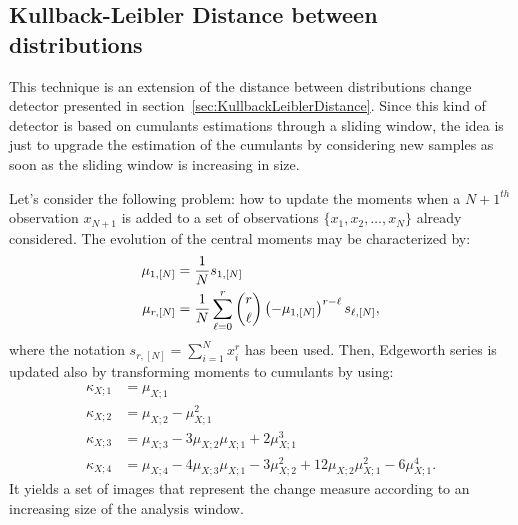 \subsection{Kullback-Leibler Distance between distributions}
\label{sec:KullbackLeiblerProfile}

This technique is an extension of the distance between distributions 
change detector presented in section~\ref{sec:KullbackLeiblerDistance}.
Since this kind of detector is based on cumulants estimations through
a sliding window, the idea is just to upgrade the estimation of the cumulants
by considering new samples as soon as the sliding window is increasing in size.

Let's consider the following problem: how to update the moments when a
$N+1^{th}$ observation $x_{N+1}$ is added to a set of observations $\{x_1, x_2, \ldots,
x_N\}$ already considered.
The evolution of the central moments may be characterized by:
\begin{align}\label{eqMomentN}
	\mu_{1,[N]} & = \frac{1}{N} s_{1,[N]} \\
	\mu_{r,[N]} & = \frac{1}{N} \sum_{\ell = 0}^r \binom{r}{\ell} 
									\left( -\mu_{1,[N]} \right)^{r-\ell}
									s_{\ell,[N]}, \notag
\end{align}
where the
notation $s_{r,[N]} = \sum_{i=1}^N x_i^r$ has been used.
Then, Edgeworth series is updated also by transforming moments to
cumulants by using:
\begin{equation}\label{eqCumsMoms}
  \begin{split}
\kappa_{X;1} &= \mu_{X;1}\\
\kappa_{X;2} &= \mu_{X;2}-\mu_{X;1}^2\\
\kappa_{X;3} &= \mu_{X;3} - 3\mu_{X;2} \mu_{X;1} + 2\mu_{X;1}^3\\
\kappa_{X;4} &= \mu_{X;4} - 4\mu_{X;3} \mu_{X;1} - 3\mu_{X;2}^2 + 12 \mu_{X;2} \mu_{X;1}^2 - 6\mu_{X;1}^4.
  \end{split}
\end{equation}
It yields a set of images that represent the change measure according to an
increasing size of the analysis window.







